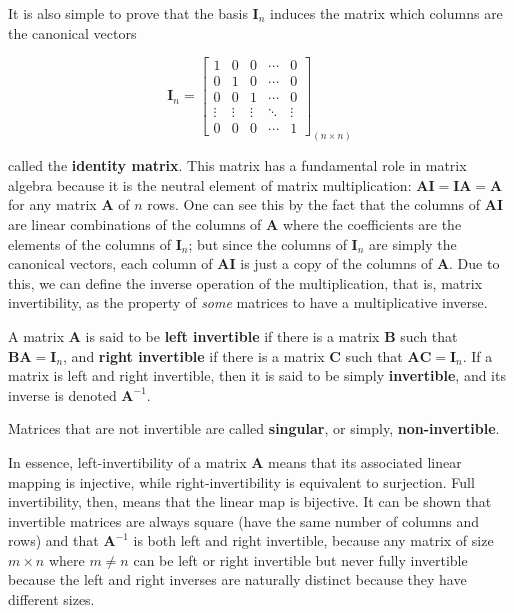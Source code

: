	It is also simple to prove that the basis $\mathbf{I}_n$ induces the matrix which columns are the canonical vectors

\begin{equation} \mathbf{I}_n = \left[\begin{array}{ccccc} 1 & 0 & 0 & \cdots & 0 \\[3mm] 0 & 1 & 0 & \cdots & 0 \\[3mm] 0 & 0 & 1 & \cdots & 0 \\[3mm] \vdots & \vdots & \vdots & \ddots & \vdots \\[3mm] 0 & 0 & 0 & \cdots & 1 \end{array}\right]_{(n\times n)}\end{equation}

	\noindent called the \textbf{identity matrix}. This matrix has a fundamental role in matrix algebra because it is the neutral element of matrix multiplication: $\mathbf{AI} = \mathbf{IA} = \mathbf{A}$ for any matrix $\mathbf{A}$ of $n$ rows. One can see this by the fact that the columns of $\mathbf{AI}$ are linear combinations of the columns of $\mathbf{A}$ where the coefficients are the elements of the columns of $\mathbf{I}_n$; but since the columns of $\mathbf{I}_n$ are simply the canonical vectors, each column of $\mathbf{AI}$ is just a copy of the columns of $\mathbf{A}$. Due to this, we can define the inverse operation of the multiplication, that is, matrix invertibility, as the property of \textit{some} matrices to have a multiplicative inverse.

\begin{definition}\label{def:invertible_matrix} A matrix $\mathbf{A}$ is said to be \textbf{left invertible} if there is a matrix $\mathbf{B}$ such that $\mathbf{BA = I}_n$, and \textbf{right invertible} if there is a matrix $\mathbf{C}$ such that $\mathbf{AC = I}_n$. If a matrix is left and right invertible, then it is said to be simply \textbf{invertible}, and its inverse is denoted $\mathbf{A}^{-1}$.

	Matrices that are not invertible are called \textbf{singular}, or simply, \textbf{non-invertible}.
\end{definition}

	In essence, left-invertibility of a matrix $\mathbf{A}$ means that its associated linear mapping is injective, while right-invertibility is equivalent to surjection. Full invertibility, then, means that the linear map is bijective. It can be shown that invertible matrices are always square (have the same number of columns and rows) and that $\mathbf{A}^{-1}$ is both left and right invertible, because any matrix of size $m\times n$ where $m\neq n$ can be left or right invertible but never fully invertible because the left and right inverses are naturally distinct because they have different sizes.

